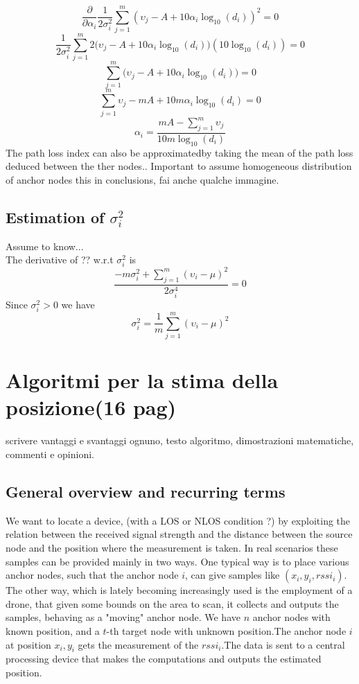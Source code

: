 \documentclass[12pt,twoside]{report}
\begin{document}
\begin{equation}
\frac{\partial}{\partial \alpha_i} \frac{1}{2\sigma^2_i}\sum_{j=1}^m(\upsilon_j-A+10\alpha_i\log_{10}(d_i))^2 =0
\end{equation}
\begin{equation}
\frac{1}{2\sigma^2_i}\sum_{j=1}^m2\big(\upsilon_j-A+10\alpha_i\log_{10}(d_i)\big)(10\log_{10}(d_i)) =0
\end{equation}
\begin{equation}
\sum_{j=1}^m\big(\upsilon_j-A+10\alpha_i\log_{10}(d_i)\big) =0
\end{equation}
\begin{equation}
\sum_{j=1}^m\upsilon_j-mA+10m\alpha_i\log_{10}(d_i)=0
\end{equation}
\begin{equation}
    \alpha_i=\frac{mA-\sum_{j=1}^m\upsilon_j}{10m\log_{10}(d_i)}
\end{equation}
The path loss index can also be approximatedby taking the mean of the path loss deduced between the ther nodes..
Important to assume homogeneous distribution of anchor nodes this in conclusions, fai anche qualche immagine.
\section{Estimation of $\sigma^2_i$}
Assume to know...\\
The derivative of ?? w.r.t $\sigma^2_i$ is 
\begin{equation}
    \frac{-m\sigma^2_i+\sum_{j=1}^m(\upsilon_i-\mu)^2}{2\sigma^4_i}=0
\end{equation}
Since $\sigma^2_i>0$ we have
\begin{equation}
    \sigma^2_i=\frac{1}{m}\sum_{j=1}^m(\upsilon_i-\mu)^2
\end{equation}

\clearpage

\chapter{Algoritmi per la stima della posizione(16 pag)}
scrivere vantaggi e svantaggi ognuno, testo algoritmo, dimostrazioni matematiche, commenti e opinioni.
\section{General overview and recurring terms}
We want to locate a device, (with a LOS or NLOS condition ?) by exploiting the relation between the received signal strength and the distance between the source node and the position where the measurement is taken. In real scenarios these samples can be provided mainly in two ways. One typical way is to place various anchor nodes, such that the anchor node $i$, can give samples like $(x_i,y_i,rssi_i)$. The other way, which is lately becoming increasingly used is the employment of a drone, that given some bounds on the area to scan, it collects and outputs the samples, behaving as a "moving" anchor node. We have $n$ anchor nodes with known position, and a $t$-th target node with unknown position.The anchor node $i$ at position $x_i,y_i$ gets the measurement of the $rssi_i$.The data is sent to a central processing device that makes the computations and outputs the estimated position. 
\end{document}

